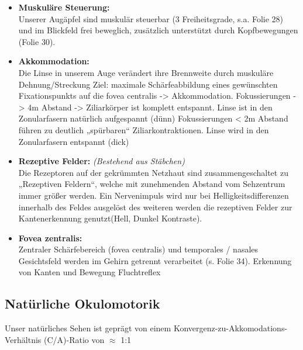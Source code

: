\begin{itemize}

\item \textbf{Muskuläre Steuerung:}\\
Unserer Augäpfel sind muskulär steuerbar (3 Freiheitsgrade,
s.a. Folie 28) und im Blickfeld frei beweglich, zusätzlich
unterstützt durch Kopfbewegungen (Folie 30).

\item \textbf{Akkommodation:} \\
Die Linse in unserem Auge verändert ihre Brennweite durch muskuläre Dehnung/Streckung Ziel: maximale Schärfeabbildung eines gewünschten Fixationspunkts auf die fovea centralis -> Akkommodation.
Fokussierungen -> 4m Abstand -> Ziliarkörper ist komplett entspannt. Linse ist in den Zonularfasern natürlich aufgespannt (dünn) Fokussierungen < 2m Abstand führen zu deutlich „spürbaren“ Ziliarkontraktionen. Linse wird in den Zonularfasern entspannt (dick)

\item \textbf{Rezeptive Felder:} \textit{(Bestehend aus Stäbchen)}\\ 
 Die Rezeptoren auf der gekrümmten Netzhaut sind zusammengeschaltet zu „Rezeptiven Feldern“, welche mit zunehmenden Abstand vom Sehzentrum immer größer werden. Ein Nervenimpuls wird nur bei Helligkeitsdifferenzen innerhalb des Feldes ausgelöst des weiteren werden die rezeptiven Felder zur Kantenerkennung genutzt(Hell, Dunkel Kontraste).

\item \textbf{Fovea zentralis:}\\
Zentraler Schärfebereich (fovea centralis) und temporales / nasales Gesichtsfeld werden im Gehirn getrennt verarbeitet (s. Folie 34). Erkennung von Kanten und Bewegung Fluchtreflex
\end{itemize}


\subsection{Natürliche Okulomotorik}

Unser natürliches Sehen ist geprägt von einem Konvergenz-zu-Akkomodations-Verhältnis (C/A)-Ratio von $\approx$ 1:1


